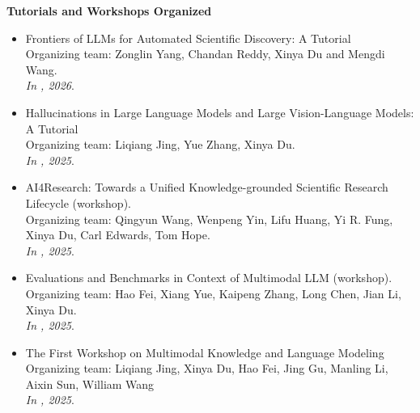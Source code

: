 \noindent \textbf{Tutorials and Workshops Organized}
\begin{itemize}[label={},leftmargin=15pt]
\item Frontiers of LLMs for Automated Scientific Discovery: A Tutorial \\
Organizing team: Zonglin Yang, Chandan Reddy, Xinya Du and Mengdi Wang. \\
{\it In \AAAI, 2026}.

\item Hallucinations in Large Language Models and Large Vision-Language Models: A Tutorial \\
Organizing team: Liqiang Jing, Yue Zhang, Xinya Du. \\
{\it In \ICMR, 2025}.

\item AI4Research: Towards a Unified Knowledge-grounded Scientific Research Lifecycle (workshop). \\
Organizing team: Qingyun Wang, Wenpeng Yin, Lifu Huang, Yi R. Fung, Xinya Du, Carl Edwards, Tom Hope. \\
{\it In \AAAI, 2025}.

\item Evaluations and Benchmarks in Context of Multimodal LLM (workshop). \\
Organizing team: Hao Fei, Xiang Yue, Kaipeng Zhang, Long Chen, Jian Li, Xinya Du. \\
{\it In \CVPR, 2025}.

\item The First Workshop on Multimodal Knowledge and Language Modeling \\
Organizing team: Liqiang Jing, Xinya Du, Hao Fei, Jing Gu, Manling Li, Aixin Sun, William Wang \\
{\it In \IJCAI, 2025}.
\end{itemize}


